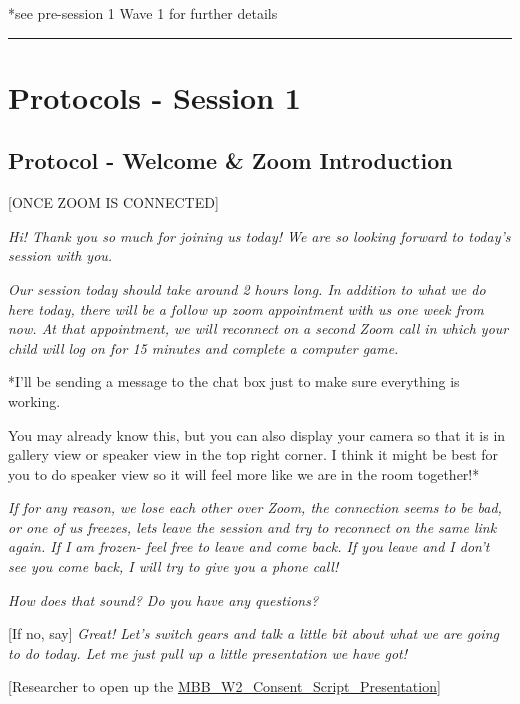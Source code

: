 \documentclass[]{book}
\begin{document}
*see pre-session 1 Wave 1 for further details

\begin{center}\rule{0.5\linewidth}{0.5pt}\end{center}

\hypertarget{protocols---session-1-1}{%
\section{Protocols - Session 1}\label{protocols---session-1-1}}

\hypertarget{protocol---welcome-zoom-introduction-1}{%
\subsection{Protocol - Welcome \& Zoom Introduction}\label{protocol---welcome-zoom-introduction-1}}

{[}ONCE ZOOM IS CONNECTED{]}

\emph{Hi! Thank you so much for joining us today! We are so looking forward to today's session with you. }

\emph{Our session today should take around 2 hours long. In addition to what we do here today, there will be a follow up zoom appointment with us one week from now. At that appointment, we will reconnect on a second Zoom call in which your child will log on for 15 minutes and complete a computer game.}

*I'll be sending a message to the chat box just to make sure everything is working.

You may already know this, but you can also display your camera so that it is in gallery view or speaker view in the top right corner. I think it might be best for you to do speaker view so it will feel more like we are in the room together!*

\emph{If for any reason, we lose each other over Zoom, the connection seems to be bad, or one of us freezes, lets leave the session and try to reconnect on the same link again. If I am frozen- feel free to leave and come back. If you leave and I don't see you come back, I will try to give you a phone call!}

\emph{How does that sound? Do you have any questions?}

{[}If no, say{]} \emph{Great! Let's switch gears and talk a little bit about what we are going to do today. Let me just pull up a little presentation we have got!}

{[}Researcher to open up the \href{https://ucla.box.com/s/i1kgjgfa81kbc1c79x67h2tfo0fo2x36}{MBB\_W2\_Consent\_Script\_Presentation}{]}
\end{document}
